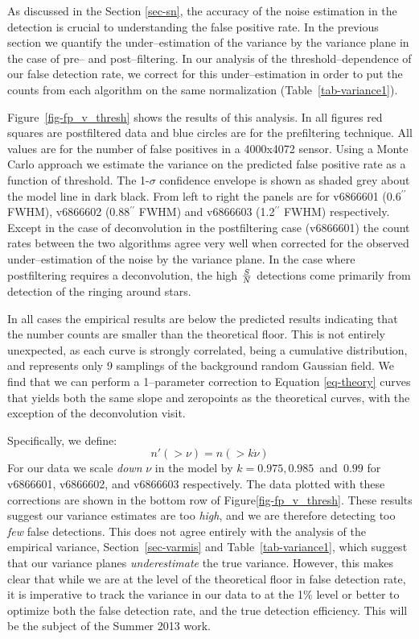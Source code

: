 \documentclass[prd, nofootinbib, floatfix, 11pt,tightenlines,times]{article}
\begin{document}
As discussed in the Section \ref{sec-sn}, the accuracy of the noise estimation in the detection is crucial to 
understanding the false positive rate.  In the previous section we quantify the under--estimation of the variance
by the variance plane in the case of pre-- and post--filtering.  In our analysis of the threshold--dependence of
our false detection rate, we correct for this under--estimation in order to put the counts from each algorithm
on the same normalization (Table~\ref{tab-variance1}).

Figure~\ref{fig-fp_v_thresh} shows the results of this analysis.  In all figures red squares are postfiltered data and
blue circles are for the prefiltering technique.  All values are for the number of false positives in a 4000x4072 sensor.
Using a Monte Carlo approach we 
estimate the variance on the predicted false positive rate as a function of threshold.  The 1-$\sigma$ confidence envelope is shown
as shaded grey about the model line in dark black.  From left to right the panels are for v6866601 (0.6$^{\prime\prime}$ FWHM),
v6866602 (0.88$^{\prime\prime}$ FWHM) and v6866603 (1.2$^{\prime\prime}$ FWHM) respectively.  Except in the case of deconvolution
in the postfiltering case (v6866601) the count rates between the two algorithms agree very well when corrected for the
observed under--estimation of the noise by the variance plane.  In the case where postfiltering requires a deconvolution, the high ${S}\over{N}$
detections come primarily from detection of the ringing around stars.

In all cases the empirical results are below the predicted results indicating
that the number counts are smaller than the theoretical floor.  This is not entirely unexpected, as each
curve is strongly correlated, being a cumulative distribution, and represents only 9 samplings of the
background random Gaussian field.  We find that we can perform a 1--parameter correction to Equation \ref{eq-theory}
curves that
yields both the same slope and zeropoints as the theoretical curves, with the exception of the deconvolution 
visit.  

Specifically, we define:
\begin{equation}
n\prime(>\nu) = n(>k\dot\nu)
\label{correction}
\end{equation}  
For our data we scale {\it down} $\nu$ in the model by $k = 0.975, 0.985 $~and~$ 0.99$ for 
v6866601, v6866602, and v6866603 respectively.  The data plotted with these corrections are shown
in the bottom row of Figure\ref{fig-fp_v_thresh}.  These results suggest our variance estimates 
are too {\it high}, and we are therefore detecting too {\it few} false detections.  This does not agree 
entirely with the analysis of the empirical variance, Section~\ref{sec-varmis} and Table~\ref{tab-variance1}, 
which suggest that our variance planes {\it underestimate} the true variance.  However, this makes clear that 
while we are at the level of the theoretical floor in false detection rate, it is imperative to track the 
variance in our data to at the 1\% level or better to optimize both the false detection rate, and the true detection
efficiency. This will be the subject of the Summer 2013 work.
\end{document}

